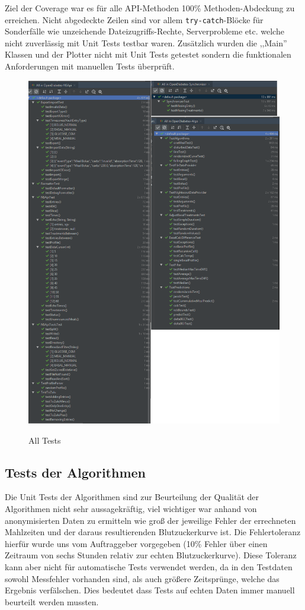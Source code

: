 \documentclass[accentcolor=tud0b,12pt,paper=a4]{tudreport}
\begin{document}
Ziel der Coverage war es für alle API-Methoden 100\% Methoden-Abdeckung zu erreichen. Nicht abgedeckte Zeilen sind vor allem \texttt{try-catch}-Blöcke für Sonderfälle wie unzeichende Dateizugriffs-Rechte, Serverprobleme etc. welche nicht zuverlässig mit Unit Tests testbar waren. Zusätzlich wurden die ,,Main'' Klassen und der Plotter nicht mit Unit Tests getestet sondern die funktionalen Anforderungen mit manuellen Tests überprüft.

\begin{figure}[h]
\centering
\caption{All Tests}
\includegraphics[width=\textwidth,height=\textheight,keepaspectratio]{all-tests}
\label{fig:all-tests}
\end{figure}

\subsection{Tests der Algorithmen}
Die Unit Tests der Algorithmen sind zur Beurteilung der Qualität der Algorithmen nicht sehr aussagekräftig, viel wichtiger war anhand von anonymisierten Daten zu ermitteln wie groß der jeweilige Fehler der errechneten Mahlzeiten und der daraus resultierenden Blutzuckerkurve ist. Die Fehlertoleranz hierfür wurde uns vom Auftraggeber vorgegeben (10\% Fehler über einen Zeitraum von sechs Stunden relativ zur echten Blutzuckerkurve). Diese Toleranz kann aber nicht für automatische Tests verwendet werden, da in den Testdaten sowohl Messfehler vorhanden sind, als auch größere Zeitsprünge, welche das Ergebnis verfälschen. Dies bedeutet dass Tests auf echten Daten immer manuell beurteilt werden mussten.
\end{document}
